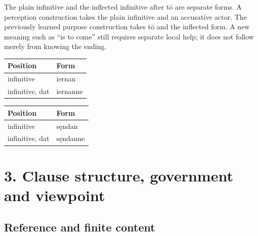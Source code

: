 The plain infinitive and the inflected infinitive after tō are separate forms. A perception construction takes the plain infinitive and an accusative actor. The previously learned purpose construction takes tō and the inflected form. A new meaning such as “is to come” still requires separate local help; it does not follow merely from knowing the ending.

\par\begingroup
\fontsize{10.5}{13.2}\selectfont
\setlength{\LTleft}{0pt}\setlength{\LTright}{\fill}
\noindent
\begin{tabular}{@{}>{\raggedright\arraybackslash}p{68.04mm}>{\raggedright\arraybackslash}p{53.15mm}@{}}
\toprule
\textbf{Position} & \textbf{Form} \\
\midrule
infinitive & iernan \\
infinitive, dat & iernanne \\
\bottomrule
\end{tabular}
\par\endgroup

\par\begingroup
\fontsize{10.5}{13.2}\selectfont
\setlength{\LTleft}{0pt}\setlength{\LTright}{\fill}
\noindent
\begin{tabular}{@{}>{\raggedright\arraybackslash}p{68.04mm}>{\raggedright\arraybackslash}p{53.15mm}@{}}
\toprule
\textbf{Position} & \textbf{Form} \\
\midrule
infinitive & sęndan \\
infinitive, dat & sęndanne \\
\bottomrule
\end{tabular}
\par\endgroup

\section*{3. Clause structure, government and viewpoint}

\subsection*{Reference and finite content}

